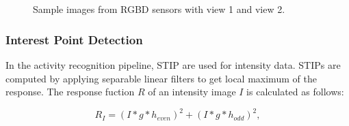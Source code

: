 \documentclass[a4paper, 10pt, conference]{ieeeconf}      %
\begin{document}
\begin{figure}
\centering
{}
\\
\\
\caption{Sample images from RGBD sensors with view 1 and view 2.}
\label{fig:cameraViews}
\end{figure}
\subsubsection{Interest Point Detection}
\label{section:InterestPointDetection}
	In the activity recognition pipeline, STIP \cite{c26} are used for intensity data. STIPs are computed by applying separable linear filters to get local maximum of the response. The response fuction $R$ of an intensity image $I$ is calculated as follows:

\begin{equation}
R_{I} = \left(I * g * h_{even}\right)^{2} + \left(I * g * h_{odd}\right)^{2},
\label{eq:stipResponseFunction}
\end{equation}
\end{document}
